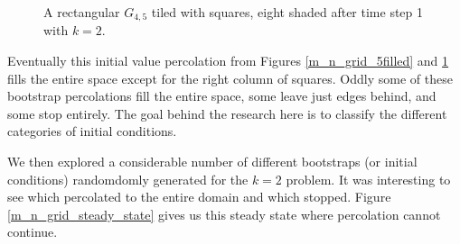\documentclass[12pt]{amsart}
\theoremstyle{definition}
\theoremstyle{question}
\begin{document}
\begin{onehalfspace}
\begin{figure}
            \caption{A rectangular $G_{4,5}$ tiled with squares, eight shaded after time step 1 with $k=2$.}
            \label{m_n_grid_8filled}
        \end{figure}
        Eventually this initial value percolation from Figures \ref{m_n_grid_5filled} and \ref{m_n_grid_8filled}
        fills the entire space except for the right column of squares.
        Oddly some of these bootstrap percolations fill the entire space, some leave just edges behind, and some stop entirely.
        The goal behind the research here is to classify the different categories of initial conditions.

        We then explored a considerable number of different bootstraps (or initial conditions) randomdomly
        generated for the $k=2$ problem.
        It was interesting to see which percolated to the entire domain and which stopped.
        Figure \ref{m_n_grid_steady_state} gives us this steady state where percolation cannot continue.
        \begin{figure}
\end{figure}
\end{onehalfspace}
\end{document}
